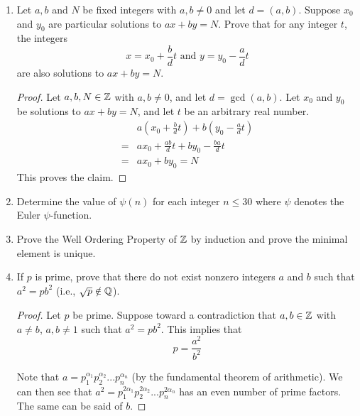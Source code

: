 \begin{enumerate}
	\begin{proof}
		Let $n$ be composite.  Then $n$ may be written as $a\cdot b$ where $1<a,b<n$.  Since $n$ divides itself, $n|a\cdot b$; however, since $a,b<n$, it is impossible for $n$ to divide $a$ or $b$.
	\end{proof}
	
	
	\item Let $a, b$ and $N$ be fixed integers with $a,b\neq 0$ and let $d = (a,b)$.  Suppose $x_0$ and $y_0$ are particular solutions to $ax+by=N$.  Prove that for any integer $t$, the integers \[x = x_0+\frac{b}{d}t \text{ and } y = y_0-\frac{a}{d}t\]
	are also solutions to $ax+by = N$.
	
	\begin{proof}
		Let $a,b,N\in\mathbb{Z}$ with $a,b\neq 0$, and let $d = \gcd(a,b)$.  Let $x_0$ and $y_0$ be solutions to $ax+by = N$, and let $t$ be an arbitrary real number.  
		\begin{align*}
			&a(x_0+\frac{b}{d}t)+b(y_0-\frac{a}{d}t)\\
			=& ax_0+\frac{ab}{d}t + by_0 - \frac{ba}{d}t\\
			=& ax_0+by_0 = N
		\end{align*}
		This proves the claim.
	\end{proof}
	
	\item Determine the value of $\psi(n)$ for each integer $n\leq 30$ where $\psi$ denotes the Euler $\psi$-function.
	
	 
	 \item Prove the Well Ordering Property of $\mathbb{Z}$ by induction and prove the minimal element is unique.
	 
	 
	 \item If $p$ is prime, prove that there do not exist nonzero integers $a$ and $b$ such that $a^2 = p b^2$ (i.e., $\sqrt{p} \notin \mathbb{Q}$).
	
	\begin{proof}
		Let $p$ be prime.  Suppose toward a contradiction that $a,b\in\mathbb{Z}$ with $a\neq b$, $a,b\neq 1$ such that $a^2 = pb^2$.  This implies that $$p = \frac{a^2}{b^2}$$
		
		Note that $a = p_1^{\alpha_1}p_{2}^{\alpha_2}...p_{n}^{\alpha_n}$ (by the fundamental theorem of arithmetic).  We can then see that $a^2 = p_1^{2\alpha_1}p_{2}^{2\alpha_2}...p_{n}^{2\alpha_n}$ has an even number of prime factors.  The same can be said of $b$.
		

\end{proof}
\end{enumerate}
